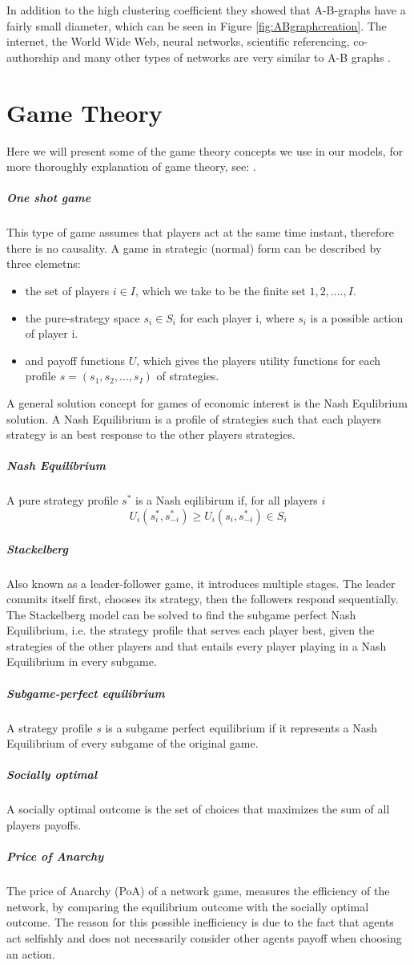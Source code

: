 In addition to the high clustering coefficient they showed that A-B-graphs have a fairly small diameter,
 which can be seen in Figure \ref{fig:ABgraphcreation}. 
The internet, the World Wide Web, neural networks, scientific referencing, co-authorship and many other types of networks are very similar to A-B graphs \cite{audestad}.

\section{Game Theory}
Here we will present some of the game theory concepts we use in our models, for more thoroughly explanation of game theory, see: \cite{nisan2007algorithmic, watson2008strategy}.
\subparagraph{One shot game}
This type of game assumes that players act at the same time instant, therefore there is no causality. A game in strategic (normal) form can be described by three elemetns:
\begin{itemize}
\item the set of players $i \in I$, which we take to be the finite set ${1,2,....,I}$.
\item the pure-strategy space $s_{i}\in S_{i}$ for each player i, where $s_{i}$ is a possible action of player i.
\item and payoff functions $U$, which gives the players utility functions for each profile $s=(s_{1},s_{2},...,s_{I})$ of strategies.
\end{itemize}
A general solution concept for games of economic interest is the Nash Equlibrium solution. A Nash Equilibrium is a profile of strategies such that each players strategy is an best response to the other players strategies. 
\subparagraph{Nash Equilibrium}
A pure strategy profile $s^{*}$ is a Nash eqilibirum if, for all players $i$
\begin{equation}
U_{i}(s^{*}_{i},s_{-i}^{*})\geq U_{i}(s_{i},s^{*}_{-i}) \in S_{i}
\end{equation}
\subparagraph{Stackelberg}
Also known as a leader-follower game, it introduces multiple stages. The leader commits itself first, chooses its strategy, then the followers respond sequentially. The Stackelberg model can be solved to find the subgame perfect Nash Equilibrium, i.e. the strategy profile that serves each player best, given the strategies of the other players and that entails every player playing in a Nash Equilibrium in every subgame.
\subparagraph{Subgame-perfect equilibrium}
A strategy profile $s$ is a subgame perfect equilibrium if it represents a Nash Equilibrium of every subgame of the original game.
\subparagraph{Socially optimal}
A socially optimal outcome is the set of choices that maximizes the sum of all players payoffs. 
\subparagraph{Price of Anarchy}
The price of Anarchy (PoA) of a network game, measures the efficiency of the network, by comparing the equilibrium outcome with the socially optimal outcome. The reason for this possible inefficiency is due to the fact that agents act selfishly and does not necessarily consider other agents payoff when choosing an action. 

